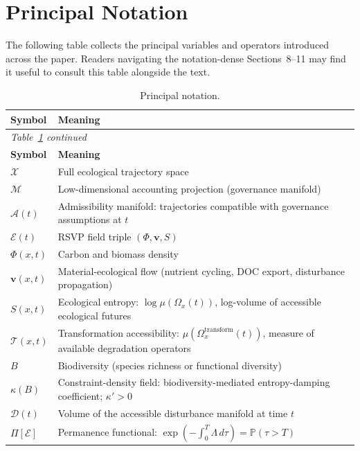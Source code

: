 \documentclass[12pt]{article}
\newcommand{\Ecal}{\mathcal{E}}
\newcommand{\Xcal}{\mathcal{X}}
\newcommand{\Mcal}{\mathcal{M}}
\newcommand{\Acal}{\mathcal{A}}
\newcommand{\Tcal}{\mathcal{T}}
\begin{document}
\section{Principal Notation}
\label{app:notation}

The following table collects the principal variables and operators introduced
across the paper. Readers navigating the notation-dense Sections~8--11 may find it
useful to consult this table alongside the text.

\begingroup
\renewcommand{\arraystretch}{1.3}
\begin{longtable}{@{}p{2.6cm}p{9.6cm}@{}}
\caption{Principal notation.\label{tab:notation}}\\
\toprule
\textbf{Symbol} & \textbf{Meaning} \\
\midrule
\endfirsthead
\multicolumn{2}{l}{\small\itshape Table~\ref{tab:notation} continued}\\
\toprule
\textbf{Symbol} & \textbf{Meaning} \\
\midrule
\endhead
\bottomrule
\endfoot
$\Xcal$ & Full ecological trajectory space \\[2pt]
$\Mcal$ & Low-dimensional accounting projection (governance manifold) \\[2pt]
$\Acal(t)$ & Admissibility manifold: trajectories compatible with governance assumptions at $t$ \\[2pt]
$\Ecal(t)$ & RSVP field triple $(\Phi,\mathbf{v},S)$ \\[2pt]
$\Phi(x,t)$ & Carbon and biomass density \\[2pt]
$\mathbf{v}(x,t)$ & Material-ecological flow (nutrient cycling, DOC export, disturbance propagation) \\[2pt]
$S(x,t)$ & Ecological entropy: $\log\mu(\Omega_x(t))$, log-volume of accessible ecological futures \\[2pt]
$\Tcal(x,t)$ & Transformation accessibility: $\mu(\Omega_x^\text{transform}(t))$, measure of available degradation operators \\[2pt]
$B$ & Biodiversity (species richness or functional diversity) \\[2pt]
$\kappa(B)$ & Constraint-density field: biodiversity-mediated entropy-damping coefficient; $\kappa'>0$ \\[2pt]
$\mathcal{D}(t)$ & Volume of the accessible disturbance manifold at time $t$ \\[2pt]
$\Pi[\Ecal]$ & Permanence functional: $\exp(-\int_0^T\!\Lambda\,d\tau)=\mathbb{P}(\tau>T)$ \\[2pt]

\end{longtable}
\end{document}
